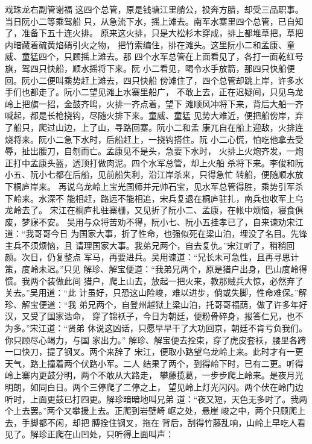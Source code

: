 戏珠龙右副管谢福
这四个总管，原是钱塘江里艄公，投奔方腊，却受三品职事。当日阮小二等乘驾船
只，从急流下水，摇上滩去。南军水寨里四个总管，已自知了，准备下五十连火排。
原来这火排，只是大松杉木穿成，排上都堆草把，草把内暗藏着硫黄焰硝引火之物，
把竹索编住，排在滩头。这里阮小二和孟康、童威、童猛四个，只顾摇上滩去。那
四个水军总管在上面看见了，各打一面乾红号旗，驾四只快船，顺水摇将下来。阮
小二看见，喝令水手放箭，那四只快船便回。阮小二便叫乘势赶上滩去，四只快船
傍滩住了，四个总管却跳上岸，许多水手们也都走了。阮小二望见滩上水寨里船广，
不敢上去，正在迟疑间，只见乌龙岭上把旗一招，金鼓齐鸣，火排一齐点着，望下
滩顺风冲将下来，背后大船一齐喊起，都是长枪挠钩，尽随火排下来。童威、童猛
见势大难近，便把船傍岸，弃了船只，爬过山边，上了山，寻路回寨。阮小二和孟
康兀自在船上迎敌，火排连烧将来。阮小二急下水时，后船赶上，一挠钩搭住。阮
小二心慌，怕吃他拿去受辱，扯出腰刀，自刎而亡。孟康见不是头，急要下水时，
火排上火炮齐发，一炮正打中孟康头盔，透顶打做肉泥。四个水军总管，却上火船
杀将下来。李俊和阮小五、阮小七都在后船，见前船失利，沿江岸杀来，只得急忙
转船，便随顺水放下桐庐岸来。
再说乌龙岭上宝光国师并元帅石宝，见水军总管得胜，乘势引军杀下岭来。水深不
能相赶，路远不能相追，宋兵复退在桐庐驻扎，南兵也收军上乌龙岭去了。
宋江在桐庐扎驻寨栅，又见折了阮小二、孟康，在帐中烦恼，寝食俱废，梦寐不安。
吴用与众将苦劝不得，阮小七、阮小五挂孝已了，自来谏劝宋江道：“我哥哥今日
为国家大事，折了性命，也强似死在梁山泊，埋没了名目。先锋主兵不须烦恼，且
请理国家大事。我弟兄两个，自去复仇。”宋江听了，稍稍回颜。次日，仍复整点
军马，再要进兵。吴用谏道：“兄长未可急性，且再寻思计策，度岭未迟。”只见
解珍、解宝便道：“我弟兄两个，原是猎户出身，巴山度岭得惯。我两个装做此间
猎户，爬上山去，放起一把火来，教那贼兵大惊，必然弃了关去。”吴用道：“此
计虽好，只恐这山险峻，难以进步，倘或失脚，性命难保。”解珍、解宝便道：“我
弟兄两个，自登州越狱上梁山泊，托哥哥福荫，做了许多年好汉，又受了国家诰命，
穿了锦袄子，今日为朝廷，便粉骨碎身，报答仁兄，也不为多。”宋江道：“贤弟
休说这凶话，只愿早早干了大功回京，朝廷不肯亏负我们。你只顾尽心竭力，与国
家出力。”
解珍、解宝便去拴束，穿了虎皮套袄，腰里各跨一口快刀，提了钢叉。两个来辞了
宋江，便取小路望乌龙岭上来。此时才有一更天气，路上撞着两个伏路小军。二人
结果了两个，到得岭下时，已有二更。听得岭上寨内更鼓分明，两个不敢从大路走，
攀藤揽葛，一步步爬上岭来。是夜月光明朗，如同白日。两个三停爬了二停之上，
望见岭上灯光闪闪。两个伏在岭门边听时，上面更鼓已打四更。解珍暗暗地叫兄弟
道：“夜又短，天色无多时了。我两个上去罢。”两个又攀援上去。正爬到岩壁崎
岖之处，悬崖峻之中，两个只顾爬上去，手脚都不闲，却把膊拴住钢叉，拖在
背后，刮得竹藤乱响，山岭上早吃人看见了。解珍正爬在山凹处，只听得上面叫声：
